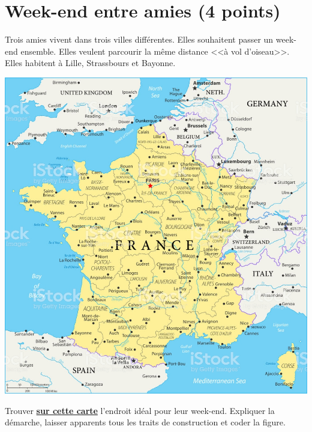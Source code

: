 \section{Week-end entre amies (4 points)}

Trois amies vivent dans trois villes différentes. Elles souhaitent passer un week-end ensemble. Elles veulent parcourir la même distance <<à vol d'oiseau>>. Elles habitent à Lille, Strassbours et Bayonne.

\begin{center}
	\includegraphics[scale=1.55]{img/france}
\end{center}

\begin{questions}
	\question[4] Trouver \textbf{\underline{sur cette carte}} l'endroit idéal pour leur week-end. Expliquer la démarche, laisser apparents tous les traits de construction et coder la figure.
\end{questions}

